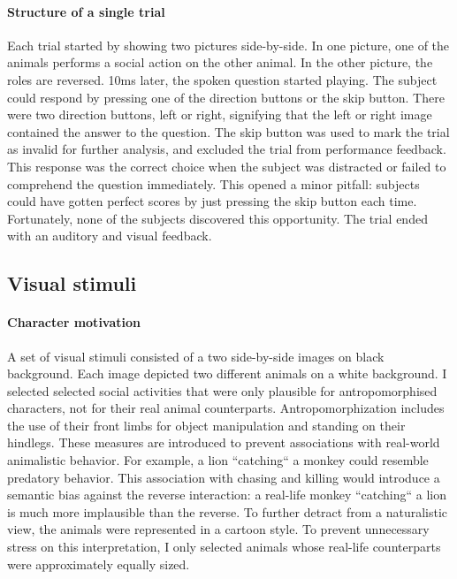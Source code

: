 \paragraph{Structure of a single trial}
Each trial started by showing two pictures side-by-side.
In one picture, one of the animals performs a social action on the other animal.
In the other picture, the roles are reversed.
10ms later, the spoken question started playing.
The subject could respond by pressing one of the direction buttons or the skip button.
There were two direction buttons, left or right, signifying that the left or right image contained the answer to the question.
The skip button was used to mark the trial as invalid for further analysis, and excluded the trial from performance feedback.
This response was the correct choice when the subject was distracted or failed to comprehend the question immediately.
This opened a minor pitfall: subjects could have gotten perfect scores by just pressing the skip button each time.
Fortunately, none of the subjects discovered this opportunity.
The trial ended with an auditory and visual feedback.


\subsection{Visual stimuli}

\paragraph{Character motivation}
A set of visual stimuli consisted of a two side-by-side images on black background.
Each image depicted two different animals on a white background.
I selected selected social activities that were only plausible for antropomorphised characters, not for their real animal counterparts.
Antropomorphization includes the use of their front limbs for object manipulation and standing on their hindlegs.
These measures are introduced to prevent associations with real-world animalistic behavior.
For example, a lion ``catching`` a monkey could resemble predatory behavior.
This association with chasing and killing would introduce a semantic bias against the reverse interaction: a real-life monkey ``catching`` a lion is much more implausible than the reverse.
To further detract from a naturalistic view, the animals were represented in a cartoon style.
To prevent unnecessary stress on this interpretation, I only selected animals whose real-life counterparts were approximately equally sized.

